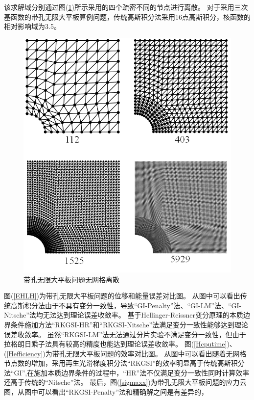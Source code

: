 该求解域分别通过图(\ref{hole.mesh})所示采用的四个疏密不同的节点进行离散。
对于采用三次基函数的带孔无限大平板算例问题，传统高斯积分法采用16点高斯积分，核函数的相对影响域为3.5。\par
\begin{figure}[H]
\centering
 \includegraphics[scale=0.7]{figure/EHR/hole/hole.mesh.png}
   \caption{带孔无限大平板问题无网格离散}\label{hole.mesh}
\end{figure}
图(\ref{EHLH})为带孔无限大平板问题的位移和能量误差对比图。
从图中可以看出传统高斯积分法由于不具有变分一致性，导致“GI-Penalty”法、“GI-LM”法、“GI-Nitsche”法均无法达到理论误差收敛率。
基于Hellinger-Reissner变分原理的本质边界条件施加方法“RKGSI-HR”和“RKGSI-Nitsche”法满足变分一致性能够达到理论误差收敛率。
虽然“RKGSI-LM”法无法通过分片实验不满足变分一致性，但由于拉格朗日乘子法具有较高的精度也能达到理论误差收敛率。
图(\ref{Hcputime})、(\ref{Hefficiency})为带孔无限大平板问题的效率对比图。
从图中可以看出随着无网格节点数的增加，采用再生光滑梯度积分法“RKGSI”的效率明显高于传统高斯积分法“GI”,在施加本质边界条件的过程中，“HR”法不仅满足变分一致性同时计算效率还高于传统的“Nitsche”法。
最后，图(\ref{sigmaxx})为带孔无限大平板问题的应力云图，从图中可以看出“RKGSI-Penalty”法和精确解之间是有差异的，
